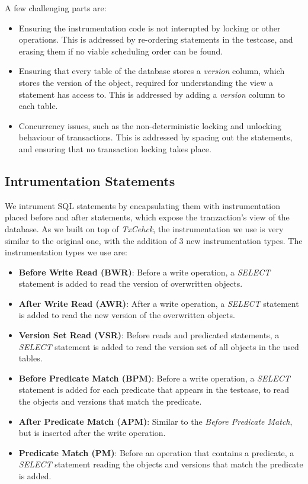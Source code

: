 A few challenging parts are:

\begin{itemize}
    \item Ensuring the instrumentation code is not interupted by locking or other operations. This is addressed by re-ordering statements in the testcase, and erasing them if no viable scheduling order can be found.
    \item Ensuring that every table of the database stores a \textit{version} column, which stores the version of the object, required for understanding the view a statement has access to. This is addressed by adding a \textit{version} column to each table.
    \item Concurrency issues, such as the non-deterministic locking and unlocking behaviour of transactions. This is addressed by spacing out the statements, and ensuring that no transaction locking takes place.
\end{itemize}


\subsection{Intrumentation Statements}

We intrument SQL statements by encapsulating them with instrumentation placed before and after statements, which expose the tranzaction's view of the database. As we built on top of \textit{TxCehck}, the instrumentation we use is very similar to the original one, with the addition of $3$ new instrumentation types. The instrumentation types we use are:

\begin{itemize}
    \item \textbf{Before Write Read (BWR)}: Before a write operation, a \textit{SELECT} statement is added to read the version of overwritten objects.
    \item \textbf{After Write Read (AWR)}: After a write operation, a \textit{SELECT} statement is added to read the new version of the overwritten objects.
    \item \textbf{Version Set Read (VSR)}: Before reads and predicated statements, a \textit{SELECT} statement is added to read the version set of all objects in the used tables.
    \item \textbf{Before Predicate Match (BPM)}: Before a write operation, a \textit{SELECT} statement is added for each predicate that appears in the testcase, to read the objects and versions that match the predicate.
    \item \textbf{After Predicate Match (APM)}: Similar to the \textit{Before Predicate Match}, but is inserted after the write operation.
    \item \textbf{Predicate Match (PM)}: Before an operation that contains a predicate, a \textit{SELECT} statement reading the objects and versions that match the predicate is added.
\end{itemize}

